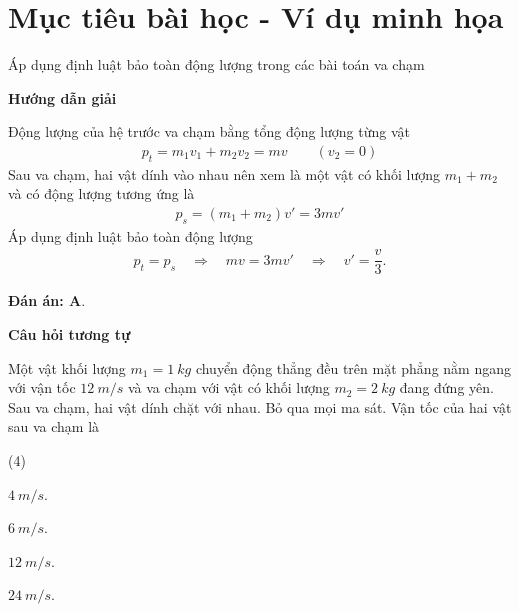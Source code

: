 \section{Mục tiêu bài học - Ví dụ minh họa}
\begin{dang}{Áp dụng định luật bảo toàn động lượng trong các bài toán va chạm}
	{	\begin{center}
			\textbf{Hướng dẫn giải}
		\end{center}
		Động lượng của hệ trước va chạm bằng tổng động lượng từng vật 
		\begin{align*}
			p_t=m_1v_1+m_2v_2=mv \qquad(v_2=0)
		\end{align*}
		Sau va chạm, hai vật dính vào nhau nên xem là một vật có khối lượng $m_1+m_2$ và có động lượng tương ứng là 
		\begin{align*}
			p_s=(m_1+m_2)v'=3mv'
		\end{align*}
		Áp dụng định luật bảo toàn động lượng 
		\begin{align*}
			p_t=p_s\quad\Rightarrow\quad mv=3mv'\quad\Rightarrow\quad v'=\dfrac{v}{3}.
		\end{align*}
		
		\textbf{Đán án: A}.
		
		\begin{center}
			\textbf{Câu hỏi tương tự}
		\end{center}
		
		Một vật khối lượng $m_1=\SI{1}{kg}$ chuyển động thẳng đều trên mặt phẳng nằm ngang với vận tốc $\SI{12}{m/s}$ và va chạm với vật có khối lượng $m_2=\SI{2}{kg}$ đang đứng yên. Sau va chạm, hai vật dính chặt với nhau. Bỏ qua mọi ma sát. Vận tốc của hai vật sau va chạm là
		\begin{mcq}(4)
			\item $\SI{4}{m/s}$. 
			\item $\SI{6}{m/s}$.
			\item $\SI{12}{m/s}$.
			\item $\SI{24}{m/s}$.
		\end{mcq}
		
}
\end{dang}
